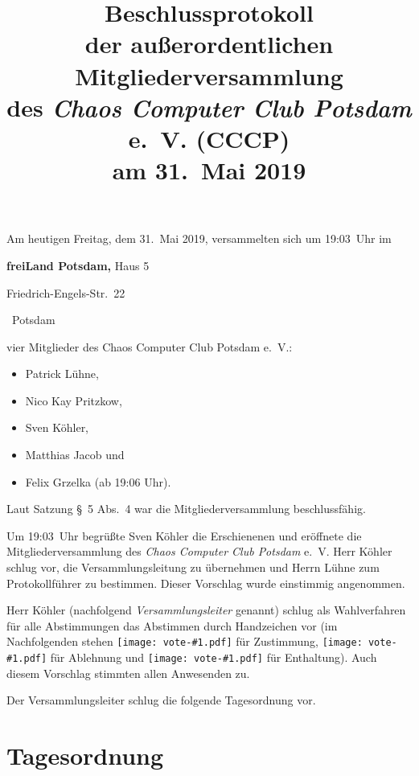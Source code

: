 \documentclass[a4paper, 10pt, headings=normal]{scrartcl}
\title{Beschlussprotokoll \\ der außerordentlichen Mitgliederversammlung \\ des \emph{Chaos Computer Club Potsdam} e.~V. (CCCP) \\ am 31.~Mai 2019}
\author{}
\date{}
\newcommand{\votesign}[1]{\texttt{[image: vote-\#1.pdf]}}
\begin{document}
\maketitle
\pagestyle{myheadings}


\noindent Am heutigen Freitag, dem 31.~Mai 2019, versammelten sich um {19:03}~Uhr im
\begin{address}\strut%
	\textbf{freiLand Potsdam,} Haus 5

	\noindent Friedrich-Engels-Str.~22

	~Potsdam
\end{address}
vier Mitglieder des Chaos Computer Club Potsdam e.~V.:

\begin{itemize}
	\item Patrick Lühne,
	\item Nico Kay Pritzkow,
	\item Sven Köhler,
	\item Matthias Jacob und
	\item Felix Grzelka (ab {19:06} Uhr).
\end{itemize}

Laut Satzung §~5 Abs.~4 war die Mitgliederversammlung beschlussfähig.

Um {19:03}~Uhr begrüßte Sven Köhler die Erschienenen und eröffnete die Mitgliederversammlung des \emph{Chaos Computer Club Potsdam} e.~V.
Herr Köhler schlug vor, die Versammlungsleitung zu übernehmen und Herrn Lühne zum Protokollführer zu bestimmen.
Dieser Vorschlag wurde einstimmig angenommen.

Herr Köhler (nachfolgend \emph{Versammlungsleiter} genannt) schlug als Wahlverfahren für alle Abstimmungen das Abstimmen durch Handzeichen vor (im Nachfolgenden stehen \votesign{yes} für Zustimmung, \votesign{no} für Ablehnung und \votesign{abstention} für Enthaltung).
Auch diesem Vorschlag stimmten allen Anwesenden zu.

Der Versammlungsleiter schlug die folgende Tagesordnung vor.

\section*{Tagesordnung}
\end{document}
